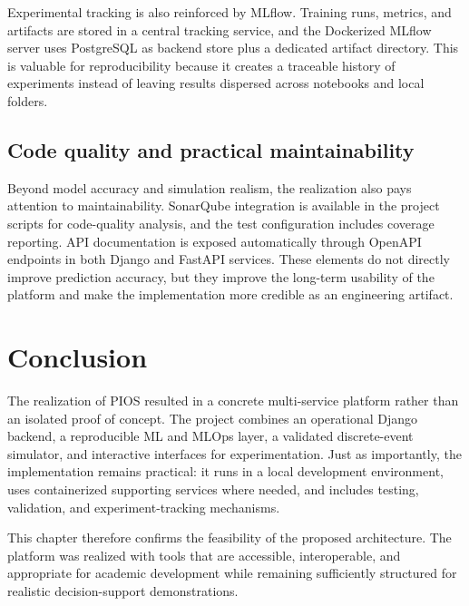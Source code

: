 Experimental tracking is also reinforced by MLflow. Training runs, metrics, and artifacts are stored in a central tracking service, and the Dockerized MLflow server uses PostgreSQL as backend store plus a dedicated artifact directory. This is valuable for reproducibility because it creates a traceable history of experiments instead of leaving results dispersed across notebooks and local folders.

\subsection{Code quality and practical maintainability}
\label{sec:quality-realization}

Beyond model accuracy and simulation realism, the realization also pays attention to maintainability. SonarQube integration is available in the project scripts for code-quality analysis, and the test configuration includes coverage reporting. API documentation is exposed automatically through OpenAPI endpoints in both Django and FastAPI services. These elements do not directly improve prediction accuracy, but they improve the long-term usability of the platform and make the implementation more credible as an engineering artifact.

\section{Conclusion}
\label{sec:realization-conclusion}

The realization of PIOS resulted in a concrete multi-service platform rather than an isolated proof of concept. The project combines an operational Django backend, a reproducible ML and MLOps layer, a validated discrete-event simulator, and interactive interfaces for experimentation. Just as importantly, the implementation remains practical: it runs in a local development environment, uses containerized supporting services where needed, and includes testing, validation, and experiment-tracking mechanisms.

This chapter therefore confirms the feasibility of the proposed architecture. The platform was realized with tools that are accessible, interoperable, and appropriate for academic development while remaining sufficiently structured for realistic decision-support demonstrations.
